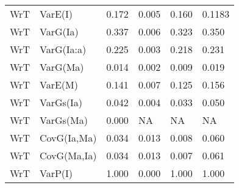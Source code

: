 \begin{center}
\begin{longtable}{|p{0.6in}|p{0.7in}|p{0.6in}|p{0.6in}|p{0.6in}|p{0.6in}|}
  WrT & VarE(I) & 0.172 & 0.005 & 0.160 & 0.1183 \\ 
  WrT & VarG(Ia) & 0.337 & 0.006 & 0.323 & 0.350 \\ 
  WrT & VarG(Ia:a) & 0.225 & 0.003 & 0.218 & 0.231  \\
  WrT & VarG(Ma) & 0.014 & 0.002 & 0.009 & 0.019  \\
  WrT & VarE(M)  & 0.141 & 0.007 & 0.125 & 0.156 \\
  WrT & VarGs(Ia) & 0.042 & 0.004 & 0.033 & 0.050 \\
  WrT & VarGs(Ma) & 0.000 & NA & NA & NA \\
  WrT & CovG(Ia,Ma) & 0.034 & 0.013 & 0.008 & 0.060 \\
  WrT & CovG(Ma,Ia) & 0.034 & 0.013 & 0.007 & 0.061 \\
  WrT & VarP(I) & 1.000 & 0.000 & 1.000 & 1.000 \\ 
   \hline
\end{longtable}
\end{center}
%
